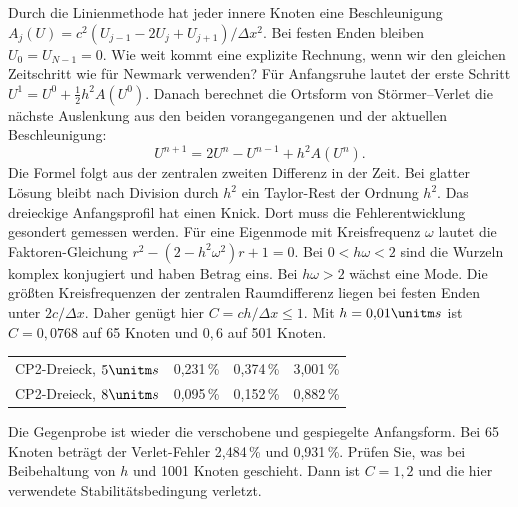Durch die Linienmethode hat jeder innere Knoten eine Beschleunigung \(A_j(U)=c^2(U_{j-1}-2U_j+U_{j+1})/\Delta x^2\). Bei festen Enden bleiben \(U_0=U_{N-1}=0\). Wie weit kommt eine explizite Rechnung, wenn wir den gleichen Zeitschritt wie für Newmark verwenden?
Für Anfangsruhe lautet der erste Schritt \(U^1=U^0+\tfrac12 h^2 A(U^0)\). Danach berechnet die Ortsform von Störmer--Verlet die nächste Auslenkung aus den beiden vorangegangenen und der aktuellen Beschleunigung:
\[
 U^{n+1}=2U^n-U^{n-1}+h^2 A(U^n).
\]
Die Formel folgt aus der zentralen zweiten Differenz in der Zeit. Bei glatter Lösung bleibt nach Division durch \(h^2\) ein Taylor-Rest der Ordnung \(h^2\). Das dreieckige Anfangsprofil hat einen Knick. Dort muss die Fehlerentwicklung gesondert gemessen werden.
Für eine Eigenmode mit Kreisfrequenz \(\omega\) lautet die Faktoren-Gleichung \(r^2-(2-h^2\omega^2)r+1=0\). Bei \(0<h\omega<2\) sind die Wurzeln komplex konjugiert und haben Betrag eins. Bei \(h\omega>2\) wächst eine Mode. Die größten Kreisfrequenzen der zentralen Raumdifferenz liegen bei festen Enden unter \(2c/\Delta x\). Daher genügt hier \(C=ch/\Delta x\le1\). Mit \(h=0{,}01\unitm s\) ist \(C=0{,}0768\) auf 65 Knoten und \(0{,}6\) auf 501 Knoten.
{\tblstart\begin{tabularx}{\linewidth}{@{}Yrrr@{}}\toprule
{}&&&\\\midrule
CP2-Dreieck, \(5\unitm s\)&0,231\,\%&0,374\,\%&3,001\,\%\\
CP2-Dreieck, \(8\unitm s\)&0,095\,\%&0,152\,\%&0,882\,\%\\\bottomrule
\end{tabularx}\par}
Die Gegenprobe ist wieder die verschobene und gespiegelte Anfangsform. Bei 65 Knoten beträgt der Verlet-Fehler 2,484\,\% und 0,931\,\%. Prüfen Sie, was bei Beibehaltung von \(h\) und 1001 Knoten geschieht. Dann ist \(C=1{,}2\) und die hier verwendete Stabilitätsbedingung verletzt.

